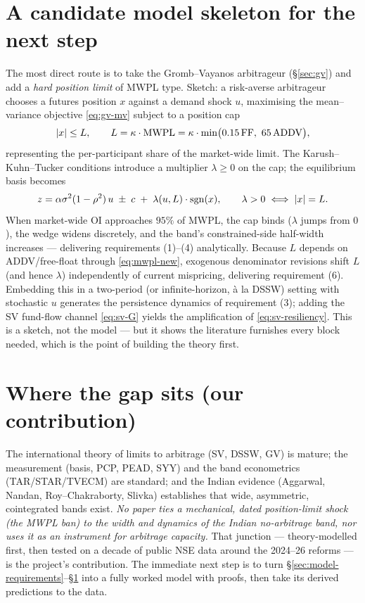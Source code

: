 \section{A candidate model skeleton for the next step}
\label{sec:skeleton}
The most direct route is to take the Gromb--Vayanos arbitrageur (\S\ref{sec:gv}) and add a \emph{hard position limit} of MWPL type. Sketch: a risk-averse arbitrageur chooses a futures position $x$ against a demand shock $u$, maximising the mean--variance objective \eqref{eq:gv-mv} subject to a position cap
\begin{equation}
\abs{x} \le L, \qquad L = \kappa\cdot\mathrm{MWPL} = \kappa\cdot\min\!\big(0.15\,\mathrm{FF},\ 65\,\mathrm{ADDV}\big),
\end{equation}
representing the per-participant share of the market-wide limit. The Karush--Kuhn--Tucker conditions introduce a multiplier $\lambda\ge 0$ on the cap; the equilibrium basis becomes
\begin{equation}
z = \alpha\sigma^2(1-\rho^2)\,u \;\pm\; c \;+\; \lambda(u,L)\cdot\mathrm{sgn}(x), \qquad \lambda>0 \iff \lvert x\rvert=L .
\end{equation}
When market-wide OI approaches $95\%$ of MWPL, the cap binds ($\lambda$ jumps from $0$), the wedge widens discretely, and the band's constrained-side half-width increases --- delivering requirements (1)--(4) analytically. Because $L$ depends on ADDV/free-float through \eqref{eq:mwpl-new}, exogenous denominator revisions shift $L$ (and hence $\lambda$) independently of current mispricing, delivering requirement (6). Embedding this in a two-period (or infinite-horizon, à la DSSW) setting with stochastic $u$ generates the persistence dynamics of requirement (3); adding the SV fund-flow channel \eqref{eq:sv-G} yields the amplification of \eqref{eq:sv-resiliency}. This is a sketch, not the model --- but it shows the literature furnishes every block needed, which is the point of building the theory first.

\section{Where the gap sits (our contribution)}
The international theory of limits to arbitrage (SV, DSSW, GV) is mature; the measurement (basis, PCP, PEAD, SYY) and the band econometrics (TAR/STAR/TVECM) are standard; and the Indian evidence (Aggarwal, Nandan, Roy--Chakraborty, Slivka) establishes that wide, asymmetric, cointegrated bands exist. \emph{No paper ties a mechanical, dated position-limit shock (the MWPL ban) to the width and dynamics of the Indian no-arbitrage band, nor uses it as an instrument for arbitrage capacity.} That junction --- theory-modelled first, then tested on a decade of public NSE data around the 2024--26 reforms --- is the project's contribution. The immediate next step is to turn \S\ref{sec:model-requirements}--\S\ref{sec:skeleton} into a fully worked model with proofs, then take its derived predictions to the data.
